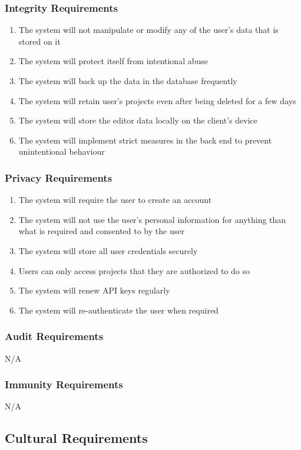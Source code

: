 \documentclass[12pt, titlepage]{article}
\begin{document}
	\subsubsection{Integrity Requirements}
	\begin{enumerate}[resume*]
		\item The system will not manipulate or modify any of the user’s data that is stored on it
		\item The system will protect itself from intentional abuse
		\item The system will back up the data in the database frequently
		\item The system will retain user's projects even after being deleted for a few days 
		\item The system will store the editor data locally on the client's device 
		\item The system will implement strict measures in the back end to prevent unintentional behaviour
	\end{enumerate}
	
	\subsubsection{Privacy Requirements}
	\begin{enumerate}[resume*]
		\item The system will require the user to create an account
		\item The system will not use the user's personal information for anything than what is required and consented to by the user
		\item The system will store all user credentials securely
		\item Users can only access projects that they are authorized to do so
		\item The system will renew API keys regularly
		\item The system will re-authenticate the user when required
	\end{enumerate}
	
	\subsubsection{Audit Requirements}
	N/A
	
	\subsubsection{Immunity Requirements}
	N/A
	\subsection{Cultural Requirements}
\end{document}

